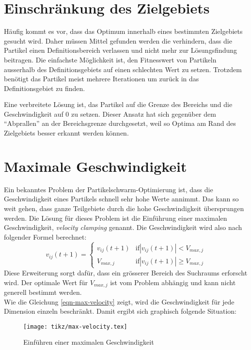 \section{Einschränkung des Zielgebiets}
Häufig kommt es vor, dass das Optimum innerhalb eines bestimmten Zielgebiets gesucht wird. Daher müssen Mittel gefunden werden die verhindern, dass die Partikel einen Definitionsbereich verlassen und nicht mehr zur Lösungsfindung beitragen. Die einfachste Möglichkeit ist, den Fitnesswert von Partikeln ausserhalb des Definitionsgebiets auf einen schlechten Wert zu setzen. Trotzdem benötigt das Partikel meist mehrere Iterationen um zurück in das Definitionsgebiet zu finden.

Eine verbreitete Lösung ist, das Partikel auf die Grenze des Bereichs und die Geschwindigkeit auf 0 zu setzen. Dieser Ansatz hat sich gegenüber dem ``Abprallen'' an der Bereichsgrenze durchgesetzt, weil so Optima am Rand des Zielgebiets besser erkannt werden können.

\section{Maximale Geschwindigkeit}
Ein bekanntes Problem der Partikelschwarm-Optimierung ist, dass die Geschwindigkeit eines Partikels schnell sehr hohe Werte annimmt. Das kann so weit gehen, dass ganze Teilgebiete durch die hohe Geschwindigkeit übersprungen werden. Die Lösung für dieses Problem ist die Einführung einer maximalen Geschwindigkeit, \textit{velocity clamping} genannt. Die Geschwindigkeit wird also nach folgender Formel berechnet:
\begin{equation}
	v_{ij}(t+1) = 
	\begin{cases}
		v_{ij}(t+1) & \text{if} |v_{ij}(t+1)| < V_{max,j} \\
		V_{max,j} & \text{if} |v_{ij}(t+1)| \geq V_{max,j}
	\end{cases}
	\label{eqn-max-velocity}
\end{equation}
Diese Erweiterung sorgt dafür, dass ein grösserer Bereich des Suchraums erforscht wird. Der optimale Wert für $V_{max,j}$ ist vom Problem abhängig und kann nicht generell bestimmt werden. \\

Wie die Gleichung \ref{eqn-max-velocity} zeigt, wird die Geschwindigkeit für jede Dimension einzeln beschränkt. Damit ergibt sich graphisch folgende Situation:

\begin{figure}[htbp]
	\centering
	\texttt{[image: tikz/max-velocity.tex]}
	\caption{Einführen einer maximalen Geschwindigkeit}
	\label{fig-max-velocity}
\end{figure}

